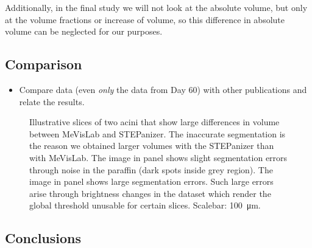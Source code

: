 \documentclass[%
	paper=a4,%
	abstract=true,%
	]{scrartcl}
\newcommand{\imsize}{\linewidth}
\begin{document}
Additionally, in the final study we will not look at the absolute volume, but only at the volume fractions or increase of volume, so this difference in absolute volume can be neglected for our purposes.

\subsection{Comparison}
\begin{itemize}
	\item Compare data (even \emph{only} the data from Day 60) with other publications and relate the results.
\end{itemize} 

\renewcommand{\imsize}{0.495\linewidth}%
\setlength\fboxsep{0pt}%
\begin{figure}[htb]
	\centering
	\hfill%
	\caption{Illustrative slices of two acini that show large differences in volume between MeVisLab and STEPanizer. The inaccurate segmentation is the reason we obtained larger volumes with the STEPanizer than with MeVisLab. The image in panel  shows slight segmentation errors through noise in the paraffin (dark spots inside grey region). The image in panel  shows large segmentation errors. Such large errors arise through brightness changes in the dataset which render the global threshold unusable for certain slices. Scalebar: \SI{100}{\micro\meter}.}
	\label{fig:MeVisSegmentation}
\end{figure}

\subsection{Conclusions}
\end{document}
